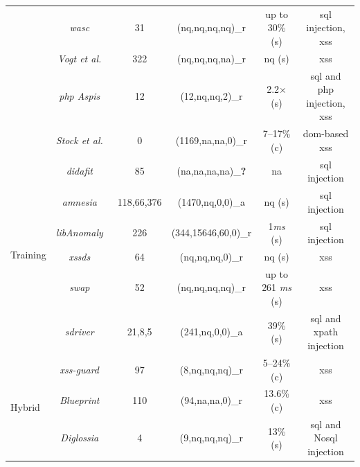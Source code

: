 \documentclass[conference]{IEEEtran}
\newcommand{\xmark}{\ding{56}}
\begin{document}
\begin{landscape}
\begin{table}
\begin{threeparttable}
\begin{small}
{\begin{tabular}{l|c|c|cc|c}
  &  	{\it {\sc wasc}}~\cite{NLC07} & 31 & ({\sc nq},{\sc nq},{\sc nq},{\sc nq})\_r & up to 30\% ({\sc s}) & {\sc sql} injection, {\sc xss} \\
	&  	{\it Vogt et al.}~\cite{VFJKKV07} & 322 & ({\sc nq},{\sc nq},{\sc nq},{\sc na})\_r & {\sc nq} ({\sc s}) & {\sc xss} \\
	&  	{\it {\sc php} Aspis}~\cite{PMP11} & 12 & (12,{\sc nq},{\sc nq},2)\_r & 2.2$\times$ ({\sc s}) & {\sc sql} and {\sc php} injection, {\sc xss} \\
	& 	{\it Stock et al.}~\cite{SLMS14} & 0 & (1169,{\sc na},{\sc na},0)\_r & 7--17\% ({\sc c}) & {\sc dom}-based {\sc xss} \\
	\hline
	\hline  
  \multirow{6}{*}{Training}
  &   {\it {\sc didafit}}~\cite{LLW02} & 85 & ({\sc na},{\sc na},{\sc na},{\sc na})\_{\bf ?} & {\sc na} & {\sc sql} injection \\
	&   {\it {\sc amnesia}}~\cite{HO05,HO06,HO05b} & 118,66,376 & (1470,{\sc nq},0,0)\_a & {\sc nq} ({\sc s}) & {\sc sql} injection \\ 
	&   {\it libAnomaly}~\cite{VMV05} & 226 & (344,15646,60,0)\_r & 1{\it ms} ({\sc s}) & {\sc sql} injection \\
	& 	{\it {\sc xssds}}~\cite{JEP08} & 64 & ({\sc nq},{\sc nq},{\sc nq},0)\_r & {\sc nq} ({\sc s}) & {\sc xss} \\
  & 	{\it {\sc swap}}~\cite{WPLKK09} & 52 & ({\sc nq},{\sc nq},{\sc nq},{\sc nq})\_r & up to 261 {\it ms} ({\sc s}) & {\sc xss} \\ 
	& 	{\it {\sc sd}river}~\cite{MS09,MKS09,MKLS11} & 21,8,5 & (241,{\sc nq},0,0)\_a & 39\% ({\sc s}) & {\sc sql} and {\sc xp}ath injection \\
  \hline
  \hline
  \multirow{3}{*}{Hybrid}
  &   {\it {\sc xss-guard}}~\cite{BV08} & 97 & (8,{\sc nq},{\sc nq},{\sc nq})\_r & 5--24\% ({\sc c}) & {\sc xss} \\
  &   {\it Blueprint}~\cite{LV09} & 110 & (94,{\sc na},{\sc na},0)\_r & 13.6\% ({\sc c}) & {\sc xss} \\
  &   {\it Diglossia}~\cite{SMS13} & 4 & (9,{\sc nq},{\sc nq},{\sc nq})\_r & 13\% ({\sc s}) & {\sc sql} and No{\sc sql} injection \\
	\hline
    \end{tabular}}
    \begin{tablenotes}
	\begin{footnotesize}

\end{footnotesize}
\end{tablenotes}
\end{small}
\end{threeparttable}
\end{table}
\end{landscape}
\end{document}
